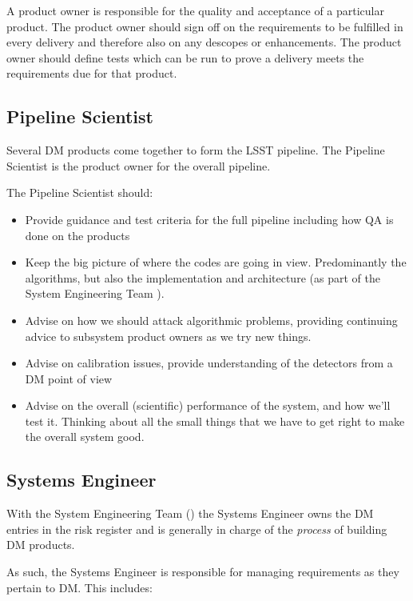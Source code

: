 A product owner is responsible for the quality and acceptance of a particular product.
The product owner should sign off on the requirements to be fulfilled in every delivery and therefore also on any descopes or enhancements.
The product owner should define tests which can be run to prove a delivery meets the requirements due for that product.

\subsection{Pipeline Scientist \label{role:pipe}}

Several DM products come together to form the LSST pipeline. The Pipeline Scientist is the product owner for the overall pipeline.

The Pipeline Scientist should:

\begin{itemize}

\item Provide guidance and test criteria for the full pipeline including how QA is done on the products
\item Keep the big picture of where the codes are going in view. Predominantly the algorithms, but also the implementation and architecture (as part of the System Engineering Team ).
\item Advise on how we should attack algorithmic problems, providing continuing advice to subsystem product owners as we try new things.
\item Advise on calibration issues, provide understanding of the detectors from a DM point of view
\item Advise on the overall (scientific) performance of the system, and how we'll test it.  Thinking about all the small things that we have to get right to make the overall system good.

\end{itemize}

\subsection{Systems Engineer \label{role:sysengineer}}

With the System Engineering Team () the Systems Engineer owns the DM entries in the risk register and is generally in charge of the \textit{process} of building DM products.

As such, the Systems Engineer is responsible for managing requirements as they pertain to DM.
This includes:

